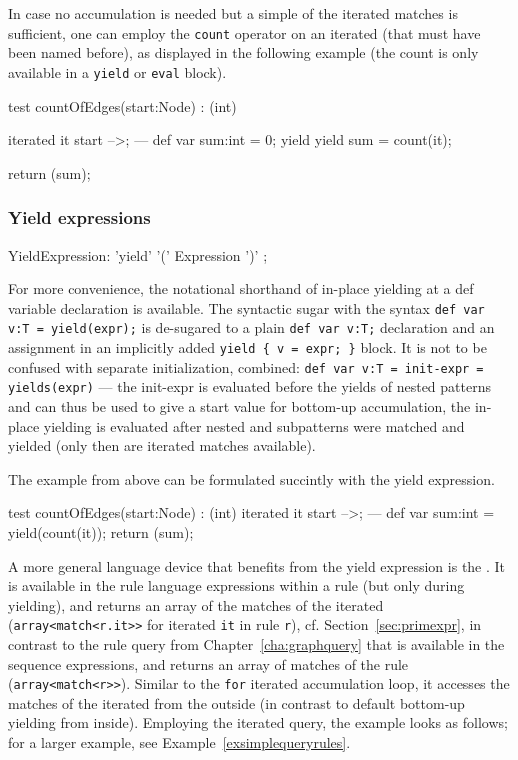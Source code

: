 In case no accumulation is needed but a simple  of the iterated matches is sufficient, one can employ the \texttt{count} operator on an iterated (that must have been named before), as displayed in the following example (the count is only available in a \texttt{yield} or \texttt{eval} block).

\begin{example}
  \begin{grgen}
test countOfEdges(start:Node) : (int)
{
	iterated it {
		start -->;
	} 
---
	def var sum:int = 0;
	yield {
		yield sum = count(it);
	}

	return (sum);
}
  \end{grgen}
\end{example}

\subsubsection*{Yield expressions} 

\begin{rail} 
  YieldExpression: 'yield' '(' Expression ')' ;
\end{rail}

For more convenience, the notational shorthand of in-place yielding at a def variable declaration is available.
The syntactic sugar with the syntax \texttt{def var v:T = yield(expr);} is de-sugared to a plain \texttt{def var v:T;} declaration and an assignment in an implicitly added \verb#yield { v = expr; }# block.
It is not to be confused with separate initialization, combined: \texttt{def var v:T = init-expr = yields(expr)} --- the init-expr is evaluated before the yields of nested patterns and can thus be used to give a start value for bottom-up accumulation, the in-place yielding is evaluated after nested and subpatterns were matched and yielded (only then are iterated matches available).

The example from above can be formulated succintly with the yield expression.

\begin{example}
  \begin{grgen}
test countOfEdges(start:Node) : (int)
{
	iterated it {
		start -->;
	} 
---
	def var sum:int = yield(count(it));
	return (sum);
}
  \end{grgen}
\end{example}


A more general language device that benefits from the yield expression is the . 
It is available in the rule language expressions within a rule (but only during yielding), and returns an array of the matches of the iterated (\texttt{array<match<r.it>>} for iterated \texttt{it} in rule \texttt{r}), cf. Section~\ref{sec:primexpr}, in contrast to the rule query from Chapter~\ref{cha:graphquery} that is available in the sequence expressions, and returns an array of matches of the rule (\texttt{array<match<r>>}).
Similar to the \texttt{for} iterated accumulation loop, it accesses the matches of the iterated from the outside (in contrast to default bottom-up yielding from inside).
Employing the iterated query, the example looks as follows; for a larger example, see Example~\ref{exsimplequeryrules}.

